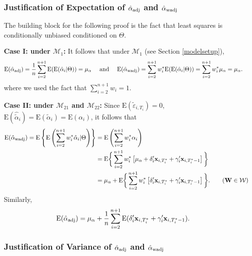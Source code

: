 \documentclass[11pt]{article}
\def\mbf#1{\mathbf{#1}} %
\def\mrm#1{\mathrm{#1}} %
\def\mc#1{\mathcal{#1}} %
\def\E#1{\mathrm{E}(#1)} %
\theoremstyle{definition}
\begin{document}
\label{proofs}

\subsubsection{Justification of Expectation of $\hat{\alpha}_{\rm adj}$ and $\hat{\alpha}_{\rm wadj}$}
\label{exp}

The building block for the following proof is the fact that least squares is conditionally unbiased conditioned on $\Theta$. 

\noindent \textbf{Case I: under $\mc{M}_{1}$:} It follows that  under $\mc{M}_{1}$ (see Section \ref{modelsetup}),
\begin{align*}
\E{\hat{\alpha}_{\rm adj}} =\frac{1}{n}  \sum_{i=2}^{n+1} \E{\E{\hat{\alpha}_i|\Theta}} = \mu_{\alpha} 
\quad \text{ and } \quad \E{\hat{\alpha}_{\rm wadj}}&= \sum_{i=2}^{n+1} w_i^* \E{\E{\hat{\alpha}_i|\Theta}}= \sum_{i=2}^{n+1} w_i^*\mu_{\alpha}= \mu_{\alpha}.
\end{align*}
where we used the fact that $\sum_{i=2}^{n+1} w_i=1$. 

\noindent \textbf{Case II: under $\mc{M}_{21}$ and $\mc{M}_{22}$:} Since $\E{\tilde{\varepsilon}_{i, T_i}}=0$, $\E{\hat{\tilde{\alpha}}_{i}}=\E{\tilde{\alpha}_{i}}=\E{\alpha_{i}}$, it follows that
  \begin{align*}
   \E{\hat{\alpha}_{\rm wadj}}= \mrm{E}\left\{\mrm{E}\left(\sum_{i=2}^{n+1} w_i^*\hat{\alpha}_i|\Theta\right)\right\}
   &= \mrm{E}\left( \sum_{i=2}^{n+1} w_i^*\alpha_i\right)\\
   &= \mrm{E}\bigg\{ \sum_{i=2}^{n+1} w_i^*\left[\mu_{\alpha}+\delta_{i}'\mbf{x}_{i, T_i^*}+\gamma_i'\mbf{x}_{i, T^*_i-1}\right]\bigg\}\\
   &=\mu_{\alpha}+\mrm{E}\bigg\{ \sum_{i=2}^{n+1} w_i^*\left[\delta_{i}'\mbf{x}_{i, T_i^*}+\gamma_i'\mbf{x}_{i, T^*_i-1}\right]\bigg\}.\tag{$\mbf{W}\in \mc{W}$}
   \end{align*}
Similarly,
  \begin{align*}
   \E{\hat{\alpha}_{\rm adj}}
   &=\mu_{\alpha}+\frac{1}{n}\sum_{i=2}^{n+1} \E{\delta_{i}'\mbf{x}_{i, T_i^*}+\gamma_i'\mbf{x}_{i, T^*_i-1}}.
   \end{align*}


\subsubsection{Justification of Variance of $\hat{\alpha}_{\rm adj}$ and $\hat{\alpha}_{\rm wadj}$}
\label{var}
\end{document}
